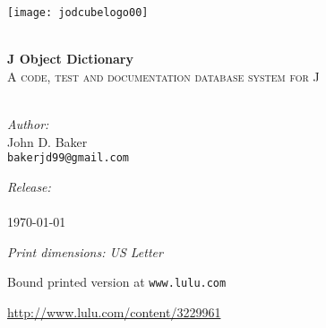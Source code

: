 \begin{titlepage}
 
\begin{center}
 
 
\texttt{[image: jodcubelogo00]}
  
 
\HRule \\[1.0cm]

{ \Huge \bfseries J Object Dictionary}\\[0.4cm]

\textsc{A code, test and documentation database system for J}\\[0.5cm]
 
\HRule \\[1.0cm]
 
 
\begin{minipage}{0.4\textwidth}
\begin{flushleft}
\emph{Author:}\\
John D. Baker \\
\texttt{bakerjd99@gmail.com} \\
\end{flushleft}
\end{minipage}
\begin{minipage}{0.4\textwidth}
\begin{flushright}
\emph{Release:}\\
\jodversion \\
\today \\
\end{flushright}
\end{minipage}

\vspace{0.8cm}

\emph{Print dimensions: US Letter}

Bound printed version at \texttt{www.lulu.com}

\href{http://www.lulu.com/content/3229961}{http://www.lulu.com/content/3229961}


\end{center}
\end{titlepage}
